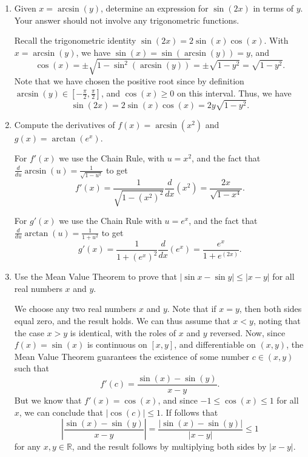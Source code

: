 \documentclass[12pt]{article}
\newcommand{\abs}[1]{\left\lvert #1\right\rvert}
\newcommand{\R}{\mathbb{R}}
\begin{document}
\thispagestyle{fancy}

 \begin{enumerate}
 \item  Given $x=\arcsin(y)$, determine an expression for $\sin(2x)$ in terms of $y$. Your answer should not involve any trigonometric functions.

\bigskip

 Recall the trigonometric identity $\sin(2x) = 2\sin(x)\cos(x)$. With $x=\arcsin(y)$, we have $\sin(x) = \sin(\arcsin(y))=y$, and 
\[
 \cos(x) = \pm\sqrt{1-\sin^2(\arcsin(y))} = \pm\sqrt{1-y^2} = \sqrt{1-y^2}.
\]
Note that we have chosen the positive root since by definition $\arcsin(y)\in \left[-\frac{\pi}{2},\frac{\pi}{2}\right]$, and $\cos(x)\geq 0$ on this interval. Thus, we have
\[
 \sin(2x) = 2\sin(x)\cos(x) = 2y\sqrt{1-y^2}.
\]

\bigskip


 

 \item  Compute the derivatives of $f(x) = \arcsin(x^2)$ and $g(x) = \arctan(e^x)$.

\bigskip

For $f'(x)$ we use the Chain Rule, with $u=x^2$, and the fact that $\frac{d}{du}\arcsin(u) = \frac{1}{\sqrt{1-u^2}}$ to get
\[
 f'(x) = \frac{1}{\sqrt{1-(x^2)^2}}\frac{d}{dx}(x^2) = \frac{2x}{\sqrt{1-x^4}}.
\]

\medskip

For $g'(x)$ we use the Chain Rule with $u=e^x$, and the fact that $\frac{d}{du}\arctan(u) = \frac{1}{1+u^2}$ to get
\[
 g'(x) = \frac{1}{1+(e^x)^2}\frac{d}{dx}(e^x) = \frac{e^x}{1+e^(2x)}.
\]

\newpage



 \item Use the Mean Value Theorem to prove that $\abs{\sin x - \sin y}\leq \abs{x-y}$ for all real numbers $x$ and $y$.

\bigskip

We choose any two real numbers $x$ and $y$. Note that if $x=y$, then both sides equal zero, and the result holds. We can thus assume that $x<y$, noting that the case $x>y$ is identical, with the roles of $x$ and $y$ reversed. Now, since $f(x) = \sin(x)$ is continuous on $[x,y]$, and differentiable on $(x,y)$, the Mean Value Theorem guarantees the existence of some number $c\in (x,y)$ such that
\[
 f'(c) = \frac{\sin(x)-\sin(y)}{x-y}.
\]
But we know that $f'(x) = \cos(x)$, and since $-1\leq \cos(x)\leq 1$ for all $x$, we can conclude that $\abs{\cos(c)}\leq 1$. If follows that
\[
 \abs{\frac{\sin(x)-\sin(y)}{x-y}} = \frac{\abs{\sin(x)-\sin(y)}}{\abs{x-y}}\leq 1
\]
for any $x,y\in \R$, and the result follows by multiplying both sides by $\abs{x-y}$.


\end{enumerate}
\end{document}
